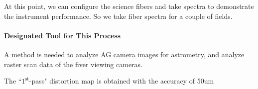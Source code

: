 At this point, we can configure the science fibers and take spectra to demonstrate the instrument performance.
So we take fiber spectra for a couple of fields.


\paragraph{Designated Tool for This Process}
A method is needed to analyze AG camera images for astrometry, and analyze raster scan data of the fiver viewing cameras.

\begin{itembox}[l]{}
The ``$1^\mathrm{st}$-pass" distortion map is obtained with the accuracy of 50um

\end{itembox}